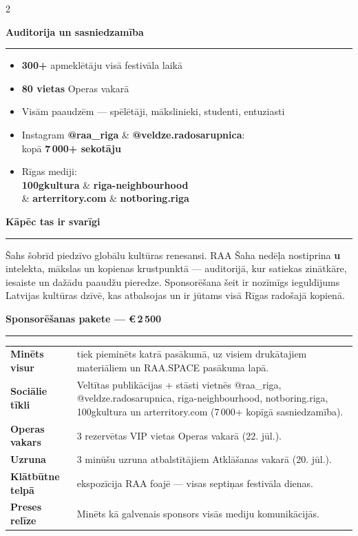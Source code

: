 \documentclass[a4paper,10pt]{article}
\newcommand{\sectionrule}[1]{%
  \vspace{3pt}%
  {\color{raared}\bfseries\large #1}\\[-3pt]%
  {\color{raared}\rule{\linewidth}{0.8pt}}%
  \vspace{2pt}%
}
\begin{document}
\begin{center}
\begin{minipage}{0.90\paperwidth}
\begin{multicols}{2}
\columnbreak

\sectionrule{Auditorija un sasniedzamība}

{\small
\begin{itemize}[leftmargin=*,itemsep=1.5pt,topsep=0pt]
  \item \textbf{300+} apmeklētāju visā festivāla laikā
  \item \textbf{80 vietas} Operas vakarā
  \item Visām paaudzēm — spēlētāji, mākslinieki, studenti, entuziasti
  \item Instagram \textbf{@raa\_riga} \& \textbf{@veldze.radosarupnica}:\\
        kopā \textbf{7\,000+ sekotāju}
  \item Rīgas mediji:\\
        \textbf{100gkultura} \& \textbf{riga-neighbourhood} \\
        \& \textbf{arterritory.com} \& \textbf{notboring.riga}
\end{itemize}
}

\vspace{0.1cm}
\sectionrule{Kāpēc tas ir svarīgi}

{\small Šahs šobrīd piedzīvo globālu kultūras renesansi. RAA Šaha nedēļa nostiprina \textbf{\sponsor u} intelekta, mākslas un kopienas krustpunktā — auditorijā, kur satiekas zinātkāre, iesaiste un dažādu paaudžu pieredze. Sponsorēšana šeit ir nozīmīgs ieguldījums Latvijas kultūras dzīvē, kas atbalsojas un ir jūtams visā Rīgas radošajā kopienā.}

\end{multicols}

\vspace{0.05cm}

\sectionrule{Sponsorēšanas pakete — €\,2\,500}

{\small
\begin{tabularx}{\linewidth}{@{} >{\bfseries}p{3.5cm} X @{}}
Minēts visur         & \sponsor{} tiek pieminēts katrā pasākumā, uz visiem drukātajiem materiāliem un RAA.SPACE pasākuma lapā. \\[2pt]
Sociālie tīkli       & Veltītas publikācijas + stāsti vietnēs @raa\_riga, @veldze.radosarupnica, riga-neighbourhood, notboring.riga, 100gkultura un arterritory.com (7\,000+ kopīgā sasniedzamība). \\[2pt]
Operas vakars        & 3 rezervētas VIP vietas Operas vakarā (22. jūl.). \\[2pt]
Uzruna               & 3 minūšu uzruna atbalstītājiem Atklāšanas vakarā (20. jūl.). \\[2pt]
Klātbūtne telpā      & \sponsor{} ekspozīcija RAA foajē — visas septiņas festivāla dienas. \\[2pt]
Preses relīze        & Minēts kā galvenais sponsors visās mediju komunikācijās. \\
\end{tabularx}
}


\end{minipage}
\end{center}
\end{document}
